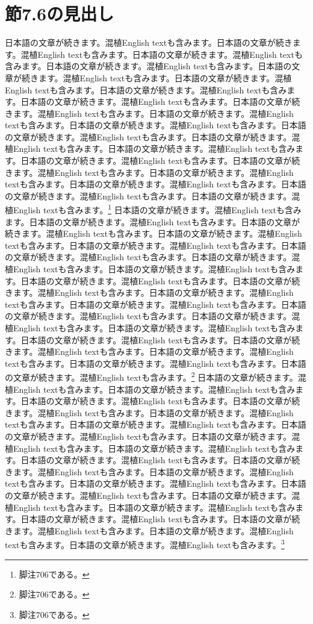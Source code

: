 \documentclass[pdflatex,book]{jlreq}
\begin{document}
\section{節7.6の見出し}
日本語の文章が続きます。混植English textも含みます。日本語の文章が続きます。混植English textも含みます。日本語の文章が続きます。混植English textも含みます。日本語の文章が続きます。混植English textも含みます。日本語の文章が続きます。混植English textも含みます。日本語の文章が続きます。混植English textも含みます。日本語の文章が続きます。混植English textも含みます。日本語の文章が続きます。混植English textも含みます。日本語の文章が続きます。混植English textも含みます。日本語の文章が続きます。混植English textも含みます。日本語の文章が続きます。混植English textも含みます。日本語の文章が続きます。混植English textも含みます。日本語の文章が続きます。混植English textも含みます。日本語の文章が続きます。混植English textも含みます。日本語の文章が続きます。混植English textも含みます。日本語の文章が続きます。混植English textも含みます。日本語の文章が続きます。混植English textも含みます。日本語の文章が続きます。混植English textも含みます。日本語の文章が続きます。混植English textも含みます。日本語の文章が続きます。混植English textも含みます。\footnote{脚注706である。}
日本語の文章が続きます。混植English textも含みます。日本語の文章が続きます。混植English textも含みます。日本語の文章が続きます。混植English textも含みます。日本語の文章が続きます。混植English textも含みます。日本語の文章が続きます。混植English textも含みます。日本語の文章が続きます。混植English textも含みます。日本語の文章が続きます。混植English textも含みます。日本語の文章が続きます。混植English textも含みます。日本語の文章が続きます。混植English textも含みます。日本語の文章が続きます。混植English textも含みます。日本語の文章が続きます。混植English textも含みます。日本語の文章が続きます。混植English textも含みます。日本語の文章が続きます。混植English textも含みます。日本語の文章が続きます。混植English textも含みます。日本語の文章が続きます。混植English textも含みます。日本語の文章が続きます。混植English textも含みます。日本語の文章が続きます。混植English textも含みます。日本語の文章が続きます。混植English textも含みます。日本語の文章が続きます。混植English textも含みます。日本語の文章が続きます。混植English textも含みます。\footnote{脚注706である。}
日本語の文章が続きます。混植English textも含みます。日本語の文章が続きます。混植English textも含みます。日本語の文章が続きます。混植English textも含みます。日本語の文章が続きます。混植English textも含みます。日本語の文章が続きます。混植English textも含みます。日本語の文章が続きます。混植English textも含みます。日本語の文章が続きます。混植English textも含みます。日本語の文章が続きます。混植English textも含みます。日本語の文章が続きます。混植English textも含みます。日本語の文章が続きます。混植English textも含みます。日本語の文章が続きます。混植English textも含みます。日本語の文章が続きます。混植English textも含みます。日本語の文章が続きます。混植English textも含みます。日本語の文章が続きます。混植English textも含みます。日本語の文章が続きます。混植English textも含みます。日本語の文章が続きます。混植English textも含みます。日本語の文章が続きます。混植English textも含みます。日本語の文章が続きます。混植English textも含みます。日本語の文章が続きます。混植English textも含みます。日本語の文章が続きます。混植English textも含みます。\footnote{脚注706である。}
\end{document}
